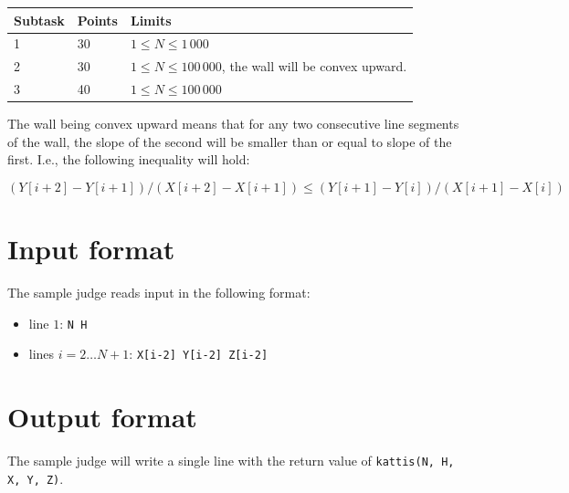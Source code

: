 \begin{tabular}{|l|l|l|}
  \hline
  \textbf{Subtask} & \textbf{Points} & \textbf{Limits} \\ \hline
  1 & 30 & $1 \le N \le 1\,000$ \\ \hline
  2 & 30 & $1 \le N \le 100\,000$, the wall will be convex upward. \\ \hline
  3 & 40 & $1 \le N \le 100\,000$ \\ \hline
\end{tabular}

The wall being convex upward means that for any two consecutive line segments of the wall, the slope of the second will be smaller than or equal to slope of the first.
I.e., the following inequality will hold:

$$(Y[i+2] - Y[i+1]) / (X[i+2] - X[i+1]) \le (Y[i+1] - Y[i]) / (X[i+1] - X[i])$$

\section*{Input format}
The sample judge reads input in the following format:

\begin{itemize}
  \item line $1$: \texttt{N H}
  \item lines $i = 2 \dots N+1$: \texttt{X[i-2] Y[i-2] Z[i-2]}
\end{itemize}

\section*{Output format}
The sample judge will write a single line with the return value of \texttt{kattis(N, H, X, Y, Z)}.
